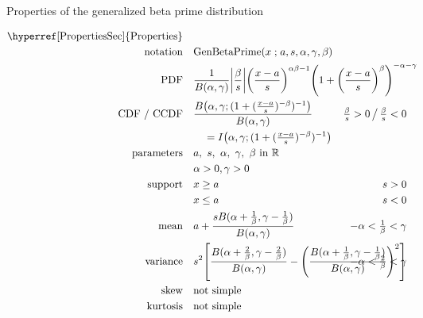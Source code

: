 

\begin{table*}[p]
\caption[Generalized beta prime distribution -- Properties]{Properties of the generalized beta prime distribution}
\begin{align*}
 \text{\hyperref[PropertiesSec]{Properties}}  \quad& \\
\text{notation} \quad & \text{GenBetaPrime}(x\given a, s, \alpha,\gamma,\beta)   \checked
\\
\text{PDF}\quad &    \frac{1}{B(\alpha, \gamma)} \Left|\frac{\beta}{s}\Right|	
\Left(\frac{x-a}{s}\Right)^{\alpha\beta -1} \Left(1+ \Left(\frac{x-a}{s}\Right)^\beta \Right)^{-\alpha-\gamma } \checked
\hspace{-30em}
\\
\text{CDF / CCDF} \quad  &  
\frac{B\big(\alpha, \gamma; (1+(\tfrac{x-a}{s})^{-\beta})^{-1} \big) }{B(\alpha,\gamma)} \checked
\hspace{-7em}
& \tfrac{\beta}{s} >0 \,\big/ \, \tfrac{\beta}{s} <0
\\ 
& \quad = I\Left(  \alpha,\gamma; (1+(\tfrac{x-a}{s})^{-\beta})^{-1} \Right)  \checked
\\
\text{parameters}\quad &   a,\ s,\ \alpha,\ \gamma,\ \beta \text{ in } \Real \checked 
\\ & \alpha>0, \gamma>0	\checked
\\
\text{support} \quad &    x \geq a &  s > 0 										
\\
&  x\leq a  &  s < 0 
\\
\text{mean} \quad  &   a+\frac{s B(\alpha+\tfrac{1}{\beta},\gamma- \tfrac{1}{\beta}) }{B(\alpha,\gamma)} 
\checked &   -\alpha< \tfrac{1}{\beta} <\gamma \checked
\\
\text{variance} \quad  &s^2\Left[\frac{ B(\alpha+\tfrac{2}{\beta},\gamma- \tfrac{2}{\beta}) }{B(\alpha,\gamma)} -  \Left(\frac{ B(\alpha+\tfrac{1}{\beta},\gamma- \tfrac{1}{\beta}) }{B(\alpha,\gamma)}\Right)^2 \Right]  \hspace{-15em}
& -\alpha< \tfrac{2}{\beta} <\gamma \checked
\\
\text{skew} \quad  &  \text{not simple}
\\
\text{kurtosis} \quad  &  \text{not simple}

\end{align*}
\end{table*}
